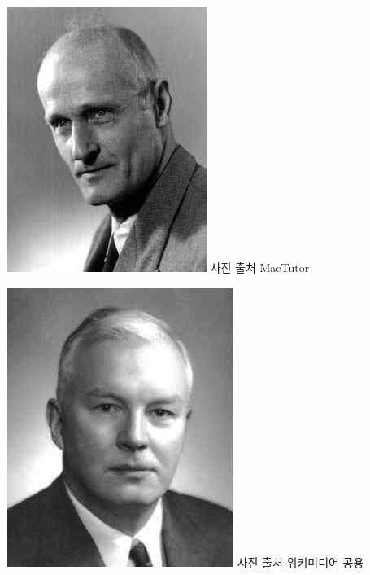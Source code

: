 \documentclass[b5paper,chapter,figtabcapt]{oblivoir}
\begin{document}
\includegraphics[scale=.2]{Kleene.jpg} 사진 출처 MacTutor

\includegraphics[scale=.2]{HaskellBCurry.jpg} 사진 출처 위키미디어 공용

\printbibliography[title=참고문헌]
\end{document}
